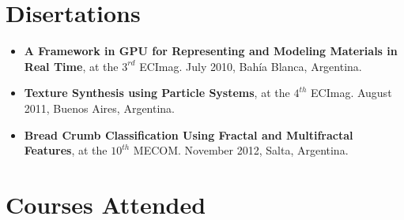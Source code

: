 \documentclass[a4paper,12pt]{article}
\begin{document}
\section*{Disertations}
\begin{itemize}
\item {\bf A Framework in GPU for Representing and Modeling Materials in Real Time}, at the $3^{rd}$ ECImag. July 2010, Bahía Blanca, Argentina.
\item {\bf Texture Synthesis using Particle Systems}, at the $4^{th}$ ECImag. August 2011, Buenos Aires, Argentina.
\item {\bf Bread Crumb Classification Using Fractal and Multifractal Features}, at the $10^{th}$ MECOM. November 2012, Salta, Argentina.
\end{itemize}


\section*{Courses Attended}
\end{document}
